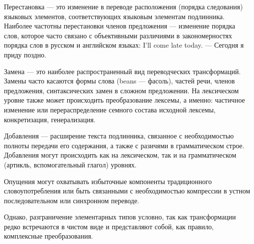 Перестановка --- это изменение в переводе расположения (порядка следования) языковых элементов, соответствующих языковым элементам подлинника. Наиболее частотны перестановки членов предложения --- изменение порядка слов, которое часто связано с объективными различиями в закономерностях порядка слов в русском и английском языках: I'll come late today. --- Сегодня я приду поздно.

Замена --- это наиболее распространенный вид переводческих трансформаций. Замены часто касаются формы слова (beans --- фасоль), частей речи, членов предложения, синтаксических замен в сложном предложении. На лексическом уровне также может происходить преобразование лексемы, а именно: частичное изменение или перераспределение семного состава исходной лексемы, конкретизация, генерализация.

Добавления --- расширение текста подлинника, связанное с необходимостью полноты передачи его содержания, а также с разичями в грамматическом строе. Добавления могут происходить как на лексическом, так и на грамматическом (артикль, вспомогательный глагол) уровнях.

Опущения могут охватывать избыточные компоненты традиционного словоупотребления или быть связанными с необходимостью компрессии в устном последовательном или синхронном переводе.

Однако, разграничение элементарных типов условно, так как трансформации редко встречаются в чистом виде и представляют собой, как правило, комплексные преобразования. 